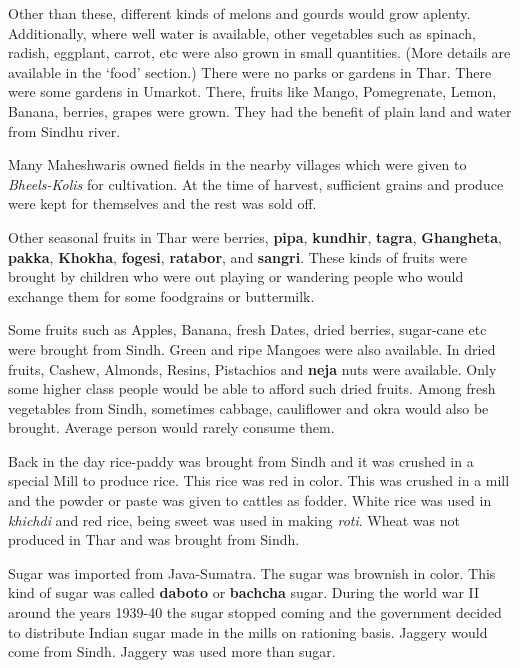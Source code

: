 Other than these, different kinds of melons and gourds would grow aplenty.
Additionally, where well water is available, other vegetables such as spinach,
radish, eggplant, carrot, etc were also grown in small quantities. (More
details are available in the `food' section.) There were no parks or gardens in
Thar. There were some gardens in Umarkot. There, fruits like Mango,
Pomegrenate, Lemon, Banana, berries, grapes were grown. They had the benefit of
plain land and water from Sindhu river.

Many Maheshwaris owned fields in the nearby villages which were given to
\textit{Bheels-Kolis} for cultivation. At the time of harvest, sufficient
grains and produce were kept for themselves and the rest was sold off. 

Other seasonal fruits in Thar were berries, \textbf{pipa}, \textbf{kundhir},
\textbf{tagra}, \textbf{Ghangheta}, \textbf{pakka}, \textbf{Khokha},
\textbf{fogesi}, \textbf{ratabor}, and \textbf{sangri}. These kinds of fruits
were brought by children who were out playing or wandering people who would
exchange them for some foodgrains or buttermilk.

Some fruits such as Apples, Banana, fresh Dates, dried berries, sugar-cane etc
were brought from Sindh. Green and ripe Mangoes were also available. In dried
fruits, Cashew, Almonds, Resins, Pistachios and \textbf{neja} nuts were
available. Only some higher class people would be able to afford such dried
fruits. Among fresh vegetables from Sindh, sometimes cabbage, cauliflower and
okra would also be brought. Average person would rarely consume them.

Back in the day rice-paddy was brought from Sindh and it was crushed in a
special Mill to produce rice. This rice was red in color. This was crushed in a
mill and the powder or paste was given to cattles as fodder. White rice was
used in \textit{khichdi} and red rice, being sweet was used in making
\textit{roti}. Wheat was not produced in Thar and was brought from Sindh. 

Sugar was imported from Java-Sumatra. The sugar was brownish in color. This
kind of sugar was called \textbf{daboto} or \textbf{bachcha} sugar. During the
world war II around the years 1939-40 the sugar stopped coming and the
government decided to distribute Indian sugar made in the mills on rationing
basis. Jaggery would come from Sindh. Jaggery was used more than sugar.

